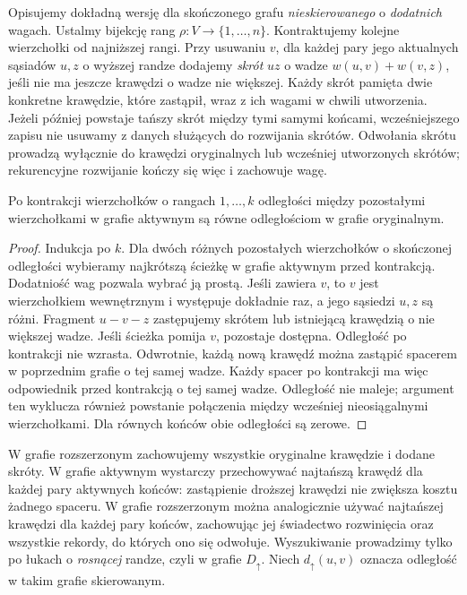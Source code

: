 Opisujemy dokładną wersję
dla skończonego grafu
\emph{nieskierowanego}
o \emph{dodatnich} wagach.
Ustalmy bijekcję rang
$\rho\colon V\to\{1,\ldots,n\}$.
Kontraktujemy kolejne
wierzchołki od
najniższej rangi.
Przy usuwaniu $v$,
dla każdej pary jego
aktualnych sąsiadów
$u,z$ o wyższej
randze dodajemy
\emph{skrót} $uz$
o wadze $w(u,v)+w(v,z)$,
jeśli nie ma jeszcze
krawędzi o wadze
nie większej.
Każdy skrót pamięta dwie konkretne krawędzie,
które zastąpił, wraz z ich wagami w chwili utworzenia.
Jeżeli później powstaje tańszy skrót między tymi
samymi końcami, wcześniejszego zapisu nie usuwamy
z danych służących do rozwijania skrótów.
Odwołania skrótu prowadzą wyłącznie do krawędzi
oryginalnych lub wcześniej utworzonych skrótów;
rekurencyjne rozwijanie kończy się więc i zachowuje wagę.

\begin{lemat}
\label{lem:tg-weighted-ch}
Po kontrakcji wierzchołków
o rangach $1,\ldots,k$
odległości między
pozostałymi wierzchołkami
w grafie aktywnym są
równe odległościom
w grafie oryginalnym.
\end{lemat}
\begin{proof}
Indukcja po $k$.
Dla dwóch różnych pozostałych wierzchołków o skończonej
odległości wybieramy najkrótszą ścieżkę w grafie aktywnym
przed kontrakcją. Dodatniość wag pozwala wybrać ją prostą.
Jeśli zawiera $v$, to $v$ jest wierzchołkiem wewnętrznym
i występuje dokładnie raz, a jego sąsiedzi $u,z$ są różni.
Fragment $u-v-z$ zastępujemy skrótem lub istniejącą
krawędzią o nie większej wadze. Jeśli ścieżka pomija $v$,
pozostaje dostępna. Odległość po kontrakcji nie wzrasta.
Odwrotnie, każdą nową krawędź można zastąpić spacerem
w poprzednim grafie o tej samej wadze. Każdy spacer
po kontrakcji ma więc odpowiednik przed kontrakcją
o tej samej wadze. Odległość nie maleje; argument ten
wyklucza również powstanie połączenia między wcześniej
nieosiągalnymi wierzchołkami. Dla równych końców obie
odległości są zerowe.
\end{proof}

W grafie rozszerzonym
zachowujemy wszystkie
oryginalne krawędzie
i dodane skróty.
W grafie aktywnym wystarczy przechowywać najtańszą
krawędź dla każdej pary aktywnych końców: zastąpienie
droższej krawędzi nie zwiększa kosztu żadnego spaceru.
W grafie rozszerzonym można analogicznie używać
najtańszej krawędzi dla każdej pary końców, zachowując
jej świadectwo rozwinięcia oraz wszystkie rekordy,
do których ono się odwołuje. Wyszukiwanie
prowadzimy tylko
po łukach o
\emph{rosnącej} randze,
czyli w grafie
$D_\uparrow$.
Niech $d_\uparrow(u,v)$
oznacza odległość
w takim grafie
skierowanym.

